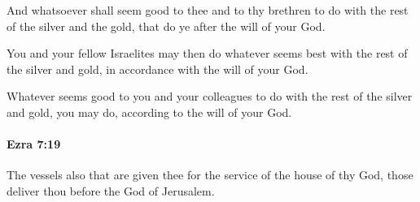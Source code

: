			\begin{versebox}
					\item[BHS] 
					\item[LXX] 
					\item[ASV] And whatsoever shall seem good to thee and to thy brethren to do with the rest of the silver and the gold, that do ye after the will of your God.
					\item[NIV] You and your fellow Israelites may then do whatever seems best with the rest of the silver and gold, in accordance with the will of your God.
					\item[NRSV] Whatever seems good to you and your colleagues to do with the rest of the silver and gold, you may do, according to the will of your God.
			\end{versebox}

		\paragraph{Ezra 7:19} %
			\label{EZRA-7-19}

			The vessels also that are given thee for the service of the house of thy God, those deliver thou before the God of Jerusalem.

